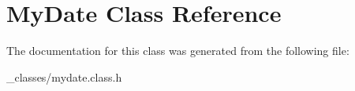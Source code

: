 \hypertarget{classMyDate}{}\section{My\+Date Class Reference}
\label{classMyDate}


The documentation for this class was generated from the following file\+:\begin{DoxyCompactItemize}
\item 
\+\_\+classes/mydate.\+class.\+h\end{DoxyCompactItemize}
